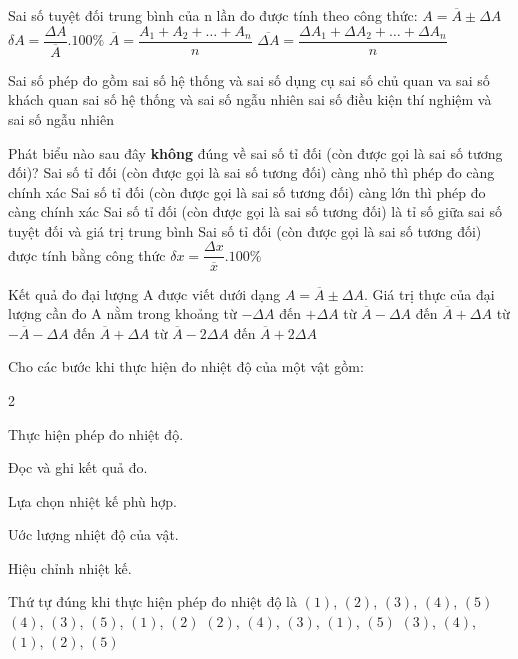 \begin{ex}%
Sai số tuyệt đối trung bình của n lần đo được tính theo công thức:
\choice
{$A=\overline{A} \pm \Delta A$}
{$\delta A=\dfrac{\Delta A}{\overline{A}} .  100\%$}
{$\overline{A}=\dfrac{A_1+A_2+\ldots+A_{n}}{n}$}
{\True $\overline{\Delta A}=\dfrac{\Delta A_1+\Delta A_2+\ldots+\Delta A_{n}}{n}$}

\loigiai{
}
\end{ex}
\begin{ex}%
Sai số phép đo gồm
\choice
{sai số hệ thống và sai số dụng cụ}
{sai số chủ quan va sai số khách quan}
{\True sai số hệ thống và sai số ngẫu nhiên}
{sai số điều kiện thí nghiệm và sai số ngẫu nhiên}

\loigiai{
}
\end{ex}
\begin{ex}%
Phát biểu nào sau đây \textbf{không} đúng về sai số tỉ đối (còn được gọi là sai số tương đối)?
\choice
{Sai số tỉ đối (còn được gọi là sai số tương đối) càng nhỏ thì phép đo càng chính xác}
{\True Sai số tỉ đối (còn được gọi là sai số tương đối) càng lớn thì phép đo càng chính xác}
{Sai số tỉ đối (còn được gọi là sai số tương đối) là tỉ số giữa sai số tuyệt đối và giá trị trung bình}
{Sai số tỉ đối (còn được gọi là sai số tương đối) được tính bằng công thức $\delta x=\dfrac{\Delta x}{\overline{x}} .  100\%$}

\loigiai{
}
\end{ex}
\begin{ex}%
Kết quả đo đại lượng A được viết dưới dạng $A=\overline{A} \pm \Delta A$. Giá trị thực của đại lượng cần đo A nằm trong khoảng
\choice
{từ $-\Delta A$ đến $+\Delta A$}
{\True từ $\overline{A}-\Delta A$ đến $\overline{A}+\Delta A$}
{từ $-\overline{A}-\Delta A$ đến $\overline{A}+\Delta A$}
{từ $\overline{A}-2 \Delta A$ đến $\overline{A}+2 \Delta A$}

\loigiai{
}
\end{ex}
\begin{ex}%
Cho các bước khi thực hiện đo nhiệt độ của một vật gồm:
\begin{enumEX}[\faEdit]{2}
\item[(1)] Thực hiện phép đo nhiệt độ.
\item[(2)] Đọc và ghi kết quả đo.
\item[(3)] Lựa chọn nhiệt kế phù hợp.
\item[(4)] Uớc lượng nhiệt độ của vật.
\item[(5)] Hiệu chỉnh nhiệt kế.
\end{enumEX}
Thứ tự đúng khi thực hiện phép đo nhiệt độ là
\choice
{$(1)$, $(2)$, $(3)$, $(4)$, $(5)$}
{\True $(4)$, $(3)$, $(5)$, $(1)$, $(2)$}
{$(2)$, $(4)$, $(3)$, $(1)$, $(5)$}
{$(3)$, $(4)$, $(1)$, $(2)$, $(5)$}

\loigiai{
%		
}
\end{ex}
